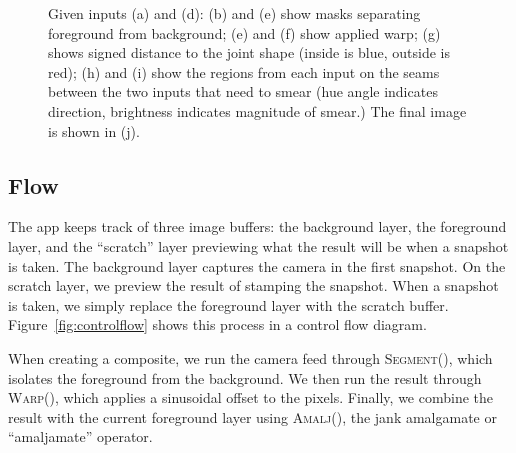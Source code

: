 \documentclass[twocolumn]{article}
\begin{document}
\begin{figure}
{    }
    \caption{Given inputs (a) and (d): (b) and (e) show masks separating foreground from background; (e) and (f) show applied warp; (g) shows signed distance to the joint shape (inside is blue, outside is red); (h) and (i) show the regions from each input on the seams between the two inputs that need to smear (hue angle indicates direction, brightness indicates magnitude of smear.) The final image is shown in (j).}
    \label{fig:steps}
\end{figure}


\subsection{Flow}

The app keeps track of three image buffers: the background layer, the foreground layer, and the ``scratch'' layer previewing what the result will be when a snapshot is taken. The background layer captures the camera in the first snapshot. On the scratch layer, we preview the result of stamping the snapshot. When a snapshot is taken, we simply replace the foreground layer with the scratch buffer. Figure~\ref{fig:controlflow} shows this process in a control flow diagram.

When creating a composite, we run the camera feed through \textsc{Segment}(), which isolates the foreground from the background. We then run the result through \textsc{Warp}(), which applies a sinusoidal offset to the pixels. Finally, we combine the result with the current foreground layer using \textsc{Amalj}(), the jank amalgamate or ``amaljamate'' operator.
\end{document}
